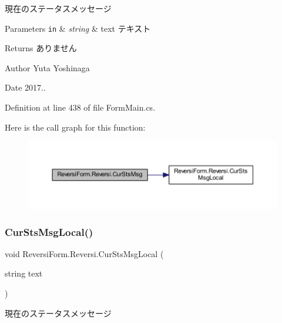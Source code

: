 現在のステータスメッセージ 


\begin{DoxyParams}[1]{Parameters}
\mbox{\tt in}  & {\em string} & text テキスト \\
\hline
\end{DoxyParams}
\begin{DoxyReturn}{Returns}
ありません 
\end{DoxyReturn}
\begin{DoxyAuthor}{Author}
Yuta Yoshinaga 
\end{DoxyAuthor}
\begin{DoxyDate}{Date}
2017.. 
\end{DoxyDate}


Definition at line 438 of file Form\+Main.\+cs.

Here is the call graph for this function\+:\nopagebreak
\begin{figure}[H]
\begin{center}
\leavevmode
\includegraphics[width=350pt]{class_reversi_form_1_1_reversi_af5009aa7b1b255b9dec7028d8a7c53f7_cgraph}
\end{center}
\end{figure}
\mbox{\label{class_reversi_form_1_1_reversi_a934897d68f7709c32b6fd126351c5f05}} 
\subsubsection{\texorpdfstring{Cur\+Sts\+Msg\+Local()}{CurStsMsgLocal()}}
{\footnotesize\ttfamily void Reversi\+Form.\+Reversi.\+Cur\+Sts\+Msg\+Local (\begin{DoxyParamCaption}\item[{string}]{text }\end{DoxyParamCaption})}



現在のステータスメッセージ 



